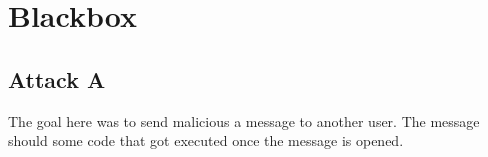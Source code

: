 \documentclass{article}
\begin{document}

\clearpage\maketitle
\thispagestyle{empty}

\newpage
\section{Blackbox}
\subsection{Attack A}
The goal here was to send malicious a message to another user. The message should some code that got executed once the message is opened.
\end{document}
